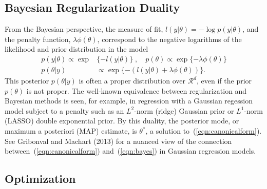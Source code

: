 \documentclass[12pt]{TD-CJS}
\newcommand{\R}{\mathcal{R}}
\newcommand{\defeq}{\mathrel{\mathop:}=}
\DeclareMathOperator*{\argmin}{arg\,min}
\begin{document}

\subsection{Bayesian Regularization Duality}

From the Bayesian perspective, the measure of fit, $l(y|\theta) = - \log p(y| \theta)$, and the penalty function, $\lambda\phi(\theta)$, correspond to the negative logarithms of the likelihood and prior distribution in the model
\begin{equation}
\label{eqn:bayes}
\begin{aligned}
 p(y | \theta) \propto \exp & \{-  l(y|\theta)\} \; , \quad p(\theta) \propto \exp\{ - \lambda\phi(\theta) \} \\
p( \theta | y ) &  \propto \exp\{- ( l(y|\theta) + \lambda\phi(\theta) ) \}.
\end{aligned}
\end{equation}
This posterior $p(\theta|y)$  is often a proper distribution over $\R^d$, even if the prior $p(\theta)$ is not proper. 
The well-known equivalence between regularization and Bayesian methods is seen,
for example, in regression with a Gaussian regession model
subject to a penalty such as an $L^2$-norm (ridge) Gaussian prior or $ L^1$-norm (LASSO) 
double exponential prior.  By this duality, the posterior mode, or maximum a posteriori (MAP) estimate, is $\theta^*$,  
a solution to~(\ref{eqn:canonicalform}).
See Gribonval and Machart (2013) for a nuanced view of the connection between~(\ref{eqn:canonicalform}) and~(\ref{eqn:bayes}) in
Gaussian regression models. 

\subsection{Optimization}
\end{document}
